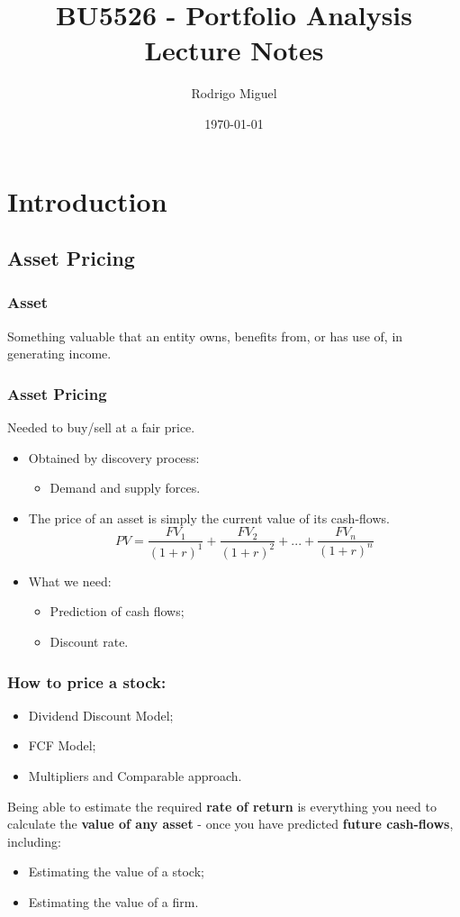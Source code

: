 \documentclass[11pt,a4paper]{report}
\title{BU5526 - Portfolio Analysis \\ Lecture Notes}
\author{Rodrigo Miguel}
\date{\today}
\begin{document}
\maketitle
\tableofcontents

\chapter{Introduction}
\section{Asset Pricing}
\subsection{Asset}
Something valuable that an entity owns, benefits from, or has use of, in generating income.
\subsection{Asset Pricing}
Needed to buy/sell at a fair price.
\begin{itemize}
    \item Obtained by discovery process:
        \begin{itemize}
            \item Demand and supply forces.
        \end{itemize}
    \item The price of an asset is simply the current value of its cash-flows.
    \[ PV = \frac{FV_1}{(1+r)^1} + \frac{FV_2}{(1+r)^2}+ ... + \frac{FV_n}{(1+r)^n} \]
        \item What we need:
        \begin{itemize}
            \item Prediction of cash flows;
            \item Discount rate.
        \end{itemize}
\end{itemize}

\subsection{How to price a stock:}
\begin{itemize}
    \item Dividend Discount Model;
    \item FCF Model;
    \item Multipliers and Comparable approach.
\end{itemize}
Being able to estimate the required \textbf{rate of return} is everything you need to calculate the \textbf{value of any asset} - once you have predicted \textbf{future cash-flows}, including:
\begin{itemize}
    \item Estimating the value of a stock;
    \item Estimating the value of a firm.
\end{itemize}
\end{document}
